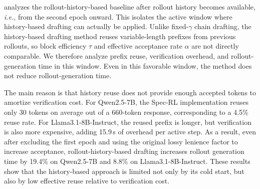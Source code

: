 \documentclass{llmxive}
\providecommand{\history}{history-based drafting}
\providecommand{\mal}{\tau}
\begin{document}
 analyzes the rollout-history-based baseline after rollout history becomes available, \textit{i.e.}, from the second epoch onward.
This isolates the active window where history-based drafting can actually be applied.
Unlike fixed-$\gamma$ chain drafting, the \history{} method reuses variable-length prefixes from previous rollouts, so block efficiency $\mal$ and effective acceptance rate $\alpha$ are not directly comparable.
We therefore analyze prefix reuse, verification overhead, and rollout-generation time in this window.
Even in this favorable window, the method does not reduce rollout-generation time.

The main reason is that history reuse does not provide enough accepted tokens to amortize verification cost.
For Qwen2.5-7B, the Spec-RL implementation reuses only 30 tokens on average out of a 660-token response, corresponding to a 4.5\% reuse rate.
For Llama3.1-8B-Instruct, the reused prefix is longer, but verification is also more expensive, adding 15.9\,s of overhead per active step.
As a result, even after excluding the first epoch and using the original lossy lenience factor to increase acceptance, rollout-history-based drafting increases rollout generation time by 19.4\% on Qwen2.5-7B and 8.8\% on Llama3.1-8B-Instruct.
These results show that the history-based approach is limited not only by its cold start, but also by low effective reuse relative to verification cost.
\end{document}
